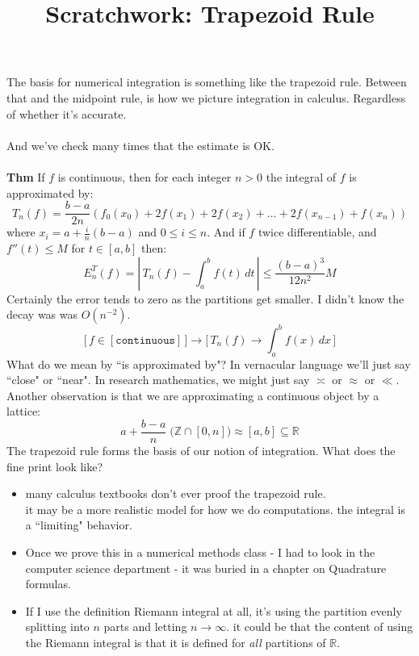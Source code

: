 \documentclass[12pt]{article}
\title{Scratchwork: Trapezoid Rule}
\date{}
\begin{document}

\sffamily

\maketitle

\noindent The basis for numerical integration is something like the trapezoid rule.  Between that and the midpoint rule, is how we picture integration in calculus.  Regardless of whether it's accurate. \\ \\
And we've check many times that the estimate is OK. \\ \\
\textbf{Thm} If $f$ is continuous, then for each integer $n > 0$ the integral of $f$ is approximated by:
$$ T_n(f) = \frac{b-a}{2n} (
f_0(x_0) + 2f(x_1) + 2f(x_2) + \dots + 2f(x_{n-1})
+ f(x_n) ) $$
where $x_i = a + \frac{i}{n}(b-a)$ and $0 \leq i \leq n$.  And if $f$ twice differentiable, and $f''(t) \leq M$ for $t \in [a,b]$ then:
$$ E_n^T(f) = \left|\, T_n(f) - \int_a^b f(t) \, dt \,\right| \leq \frac{(b-a)^3}{12n^2}M $$
Certainly the error tends to zero as the partitions get smaller.  I didn't know the decay was was $O(n^{-2})$.
$$
\bigg[\, f \in [\texttt{continuous}] \,\bigg] 
\to \bigg[\, T_n(f) \to \int_a^b f(x) \, dx \,\bigg]  $$
What do we mean by ``is approximated by"?  In vernacular language we'll just say ``close" or ``near".  In research mathematics, we might just say $\asymp$ or $\approx$ or $\ll$.  Another observation is that we are approximating a continuous object by a lattice:
$$  a + \frac{b-a}{n} \;\Big(\mathbb{Z}\cap [0,n]\Big) \approx [a,b] \subseteq \mathbb{R}$$
The trapezoid rule forms the basis of our notion of integration.  What does the fine print look like?
\begin{itemize}
\item many calculus textbooks don't ever proof the trapezoid rule.\\
it may be a more realistic model for how we do computations. the integral is a ``limiting" behavior.  
\item Once we prove this in a numerical methods class - I had to look in the computer science department - it was buried in a chapter on Quadrature formulas. 
\item If I use the definition Riemann integral at all, it's using the partition evenly splitting into $n$ parts and letting $n \to \infty$.  it could be that the content of using the Riemann integral is that it is defined for \textit{all} partitions of $\mathbb{R}$. 
\end{itemize}
\end{document}
